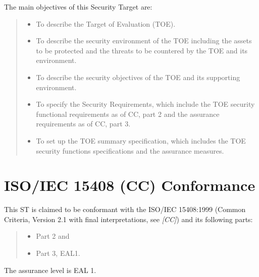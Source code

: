 \documentclass[10pt,a4paper,english]{scrbook}
\begin{document}
The main objectives of this Security Target are:
\begin{quote}
\begin{itemize}
\item {} 
To describe the Target of Evaluation (TOE).

\item {} 
To describe the security environment of the TOE including the assets to
be protected and the threats to be countered by the TOE and its
environment.

\item {} 
To describe the security objectives of the TOE and its supporting
environment.

\item {} 
To specify the Security Requirements, which include the TOE security
functional requirements as of CC, part 2 and the assurance requirements as
of CC, part 3.

\item {} 
To set up the TOE summary specification, which includes the TOE
security functions specifications and the assurance measures.

\end{itemize}
\end{quote}



\hypertarget{iso-iec-15408-cc-conformance}{}
\section{ISO/IEC 15408 (CC) Conformance}

This ST is claimed to be conformant with the ISO/IEC 15408:1999 (Common
Criteria, Version 2.1 with final interpretations, see \emph{{[}CC]}) and its following
parts:
\begin{quote}
\begin{itemize}
\item {} 
Part 2 and

\item {} 
Part 3, EAL1.

\end{itemize}
\end{quote}

The assurance level is EAL 1.


\end{document}
